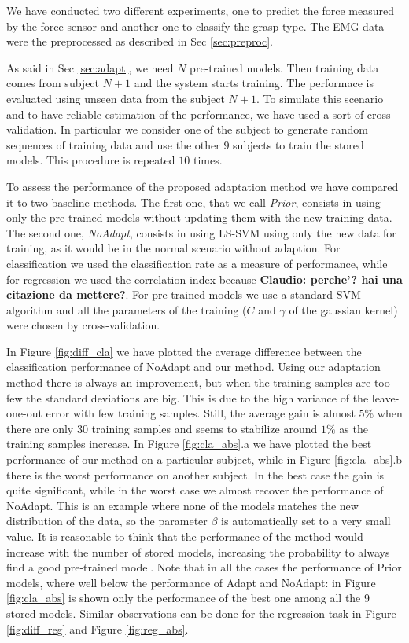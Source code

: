 We have conducted two different experiments, one to predict the force measured
by the force sensor and another one to classify the grasp type.
The EMG data were the preprocessed as described in Sec \ref{sec:preproc}.

As said in Sec \ref{sec:adapt}, we need $N$ pre-trained models.
Then training data comes from subject $N+1$ and the system starts
training. The performace is evaluated using unseen data from the subject
$N+1$.
To simulate this scenario and to have reliable estimation of the
performance, we have used a sort of cross-validation.
In particular we consider one of the subject to generate random sequences
of training data and use the other $9$ subjects to train the stored models.
This procedure is repeated $10$ times.

To assess the performance of the proposed adaptation method we have compared it
to two baseline methods. The first one, that we call \emph{Prior}, consists in
using only the pre-trained models without updating them with the new training data.
The second one, \emph{NoAdapt}, consists in using LS-SVM using only the new data
for training, as it would be in the normal scenario without adaption.
For classification we used the classification rate as a measure of performance,
while for regression we used the correlation index because \textbf{Claudio: perche'?
hai una citazione da mettere?}.
For pre-trained models we use a standard SVM algorithm and all the parameters of the
training ($C$ and $\gamma$ of the gaussian kernel) were chosen by cross-validation.

In Figure \ref{fig:diff_cla} we have plotted the average difference between 
the classification performance of NoAdapt and our method. Using our adaptation
method there is always an improvement, but when the training samples are too
few the standard deviations are big. This is due to the high variance of the
leave-one-out error with few training samples. Still, the average gain is
almost $5\%$ when there are only 30 training samples and seems to stabilize
around $1\%$ as the training samples increase.
In Figure \ref{fig:cla_abs}.a we have plotted the best performance of our method
on a particular subject, while in Figure \ref{fig:cla_abs}.b there is the worst
performance on another subject. In the best case the gain is quite significant,
while in the worst case we almost recover the performance of NoAdapt. This is an example
where none of the models matches the new distribution of the data, so the parameter
$\beta$ is automatically set to a very small value. It is reasonable to think
that the performance of the method would increase with the number of stored
models, increasing the probability to always find a good pre-trained model.
Note that in all the cases the performance of Prior models, where well
below the performance of Adapt and NoAdapt: in Figure \ref{fig:cla_abs} is shown
only the performance of the best one among all the 9 stored models.
Similar observations can be done for the regression task in Figure \ref{fig:diff_reg}
and Figure \ref{fig:reg_abs}.

